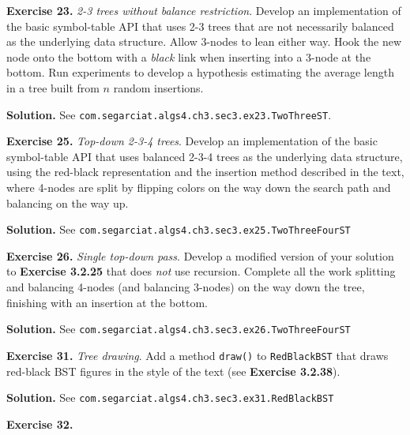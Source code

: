 \documentclass[12pt, a4paper]{article}
\newenvironment{ex}[2][Exercise]
{\par\medskip\noindent \textbf{#1 #2.}}
{\medskip}
\newenvironment{sol}[1][Solution]
{\par\medskip\noindent \textbf{#1.} }
{\medskip}
\begin{document}
	\begin{ex}{23}
		\emph{2-3 trees without balance restriction}. Develop an implementation of the basic
		symbol-table API that uses 2-3 trees that are not necessarily balanced as the underlying
		data structure. Allow 3-nodes to lean either way. Hook the new node onto the bottom
		with a \emph{black} link when inserting into a 3-node at the bottom. Run experiments
		to develop a hypothesis estimating the average length in a tree built from $n$ random
		insertions.
	\end{ex}
	\begin{sol}
		See \texttt{com.segarciat.algs4.ch3.sec3.ex23.TwoThreeST}.
	\end{sol}
	\begin{ex}{25}
		\emph{Top-down 2-3-4 trees}. Develop an implementation of the basic symbol-table API
		that uses balanced 2-3-4 trees as the underlying data structure, using the red-black
		representation and the insertion method described in the text, where 4-nodes are split
		by flipping colors on the way down the search path and balancing on the way up.
	\end{ex}
	\begin{sol}
		See \texttt{com.segarciat.algs4.ch3.sec3.ex25.TwoThreeFourST}
	\end{sol}
	\begin{ex}{26}
		\emph{Single top-down pass}. Develop a modified version of your solution to
		\textbf{Exercise 3.2.25} that does \emph{not} use recursion. Complete all the work
		splitting and balancing 4-nodes (and balancing 3-nodes) on the way down the tree,
		finishing with an insertion at the bottom.
	\end{ex}
	\begin{sol}
		See \texttt{com.segarciat.algs4.ch3.sec3.ex26.TwoThreeFourST}
	\end{sol}
	\begin{ex}{31}
		\emph{Tree drawing}. Add a method \texttt{draw()} to \texttt{RedBlackBST} that
		draws red-black BST figures in the style of the text (see \textbf{Exercise 3.2.38}).
	\end{ex}
	\begin{sol}
		See \texttt{com.segarciat.algs4.ch3.sec3.ex31.RedBlackBST}
	\end{sol}
	\begin{ex}{32}
	\end{ex}
\end{document}
